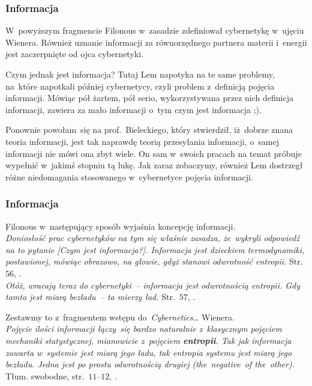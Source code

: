 \documentclass[10pt,t]{beamer}
\begin{document}
\begin{frame}
  \frametitle{Informacja}


  W~powyższym fragmencie Filonous w~zasadzie zdefiniował cybernetykę
  w~ujęciu Wienera. Również uznanie informacji za równorzędnego partnera
  materii i~energii jest zaczerpnięte od ojca cybernetyki.

  Czym jednak jest informacja? Tutaj Lem napotyka na te same problemy,
  na~które napotkali później cybernetycy, czyli problem z~definicją pojęcia
  informacji. Mówiąc pół żartem, pół serio, wykorzystywana przez nich
  definicja informacji, zawiera za mało informacji o~tym czym jest
  informacja ;).

  Ponownie powołam~się na prof.~Bieleckiego, który stwierdził, iż~dobrze
  znana teoria informacji, jest tak naprawdę teorią \alert{przesyłania}
  informacji, o~samej informacji nie mówi ona zbyt wiele. On sam w~swoich
  pracach na temat
   próbuje wypełnić w~jakimś stopniu tą lukę. Jak zaraz
  zobaczymy, również Lem dostrzegł różne niedomagania stosowanego
  w~cybernetyce pojęcia informacji.

\end{frame}





\begin{frame}
  \frametitle{Informacja}


  Filonous w~następujący sposób wyjaśnia koncepcję informacji. \\
  \textit{Doniosłość prac cybernetyków na tym się właśnie zasadza,
    że~wykryli odpowiedź na to pytanie [Czym jest informacja?]. Informacja
    jest dzieckiem termodynamiki, postawionej, mówiąc obrazowo, na głowie,
    gdyż stanowi odwrotność entropii.}
  Str.~$56$, \parencite{Lem-Dialogi-Vol-I-Pub-1996}. \\
  \textit{Otóż, wracają teraz do cybernetyki~-- informacja jest odwrotnością
    entropii. Gdy tamta jest miarą bezładu~-- ta mierzy ład.}
  Str.~$57$, \parencite{Lem-Dialogi-Vol-I-Pub-1996}.

  Zestawmy to z~fragmentem wstępu do~\textit{Cybernetics\ldots} Wienera. \\
  \textit{Pojęcie ilości informacji łączy~się bardzo naturalnie
    z~klasycznym pojęciem mechaniki statystycznej, mianowicie z~pojęciem
    \textbf{entropii}. Tak jak informacja zawarta w~systemie jest miarą jego
    ładu, tak entropia systemu jest miarą jego bezładu. Jedna jest po
    prostu odwrotnością drugiej (the~negative~of the~other).}
  Tłum. swobodne, str.~$11\text{--}12$,
  \parencite{Wiener-Cybernetics-Second-edition-Pub-2016}.

\end{frame}
\end{document}
